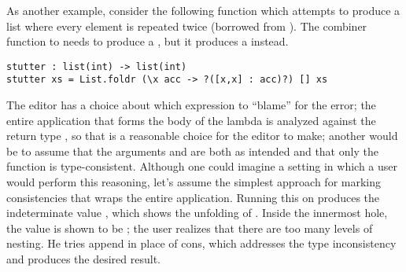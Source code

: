 %
As another example, consider the following function which attempts to produce a
list where every element is repeated twice (borrowed from \citep{XXX}).
%
The combiner function to  needs to produce a , but
it produces a  instead.

\begin{lstlisting}
stutter : list(int) -> list(int)
stutter xs = List.foldr (\x acc -> ?([x,x] : acc)?) [] xs
\end{lstlisting}

\noindent
%
The editor has a choice about which expression to ``blame'' for the error; the
entire application that forms the body of the lambda is analyzed against the
return type , so that is a reasonable choice for the editor to
make; another would be to assume that the arguments \li{[x,x]} and  are
both as intended and that only the function \li{(:)} is type-consistent.
%
Although one could imagine a setting in which a user would perform this
reasoning, let's assume the simplest approach for marking consistencies that
wraps the entire application.
%
Running this on  produces the indeterminate value
, which shows the unfolding of
.
%
Inside the innermost hole, the value is shown to be \li{[[3,3]]}; the user
realizes that there are too many levels of nesting.
%
He tries append in place of cons, which addresses the type inconsistency and
produces the desired result.




